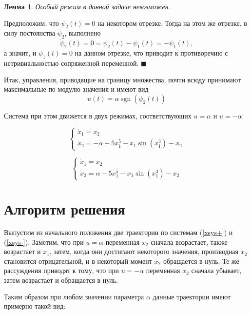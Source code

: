 \documentclass[16pt]{article}
\newtheorem{Lem}{Лемма}
\newenvironment{Proof}{\par\noindent{\bf Доказательство.}}{\hfill$\scriptstyle\blacksquare$}
\DeclareMathOperator{\Sign}{sgn}
\begin{document}
\begin{Lem}
Особый режим в данной задаче невозможен.
\end{Lem}
\begin{Proof}
Предположим, что $\psi_2(t) = 0$ на некотором отрезке. Тогда на этом же отрезке, в силу постоянства $\psi_2$,
 выполнено $$\dot \psi_2(t) = 0 = \psi_2(t) - \psi_1(t) = -\psi_1(t),$$ а значит, и $\psi_1(t) = 0$ на данном отрезке, 
 что приводит к противоречию с нетривиальностью сопряженной переменной.
\end{Proof}

Итак, управления, приводящие на границу множества, почти всюду принимают максимальные по модулю значения
и имеют вид
$$u(t) = \alpha \Sign( \psi_2(t))$$

Система при этом движется в двух режимах, соответствующих $u = \alpha$ и $u = -\alpha$:

\begin{equation}\label{xsys-}\tag{---}
\begin{cases}
\dot x_1 = x_2 \\
\dot x_2 = -\alpha - 5x_1^5-x_1\sin(x_1^3)-x_2
\end{cases}
\end{equation}


\begin{equation}\label{xsys+}\tag{+}
\begin{cases}
\dot x_1 = x_2 \\
\dot x_2 = \alpha - 5x_1^5-x_1\sin(x_1^3)-x_2
\end{cases}
\end{equation}

\newpage
\section{Алгоритм решения}
Выпустим из начального положения две траектории по системам (\ref{xsys+}) и (\ref{xsys-}).
Заметим, что при $u = \alpha$ переменная $x_2$ сначала возрастает, также возрастает и $x_1$, затем, когда
они достигают некоторого значения, производная $\dot x_2$ становится отрицательной, и в некоторый момент
$x_2$ обращается в нуль. Те же рассуждения приводят к тому, что при $u = -\alpha$ переменная $x_2$
сначала убывает, затем возрастает и обращается в нуль. 

Таким образом при любом значении параметра $\alpha$ данные траектории имеют примерно такой вид:
\end{document}
